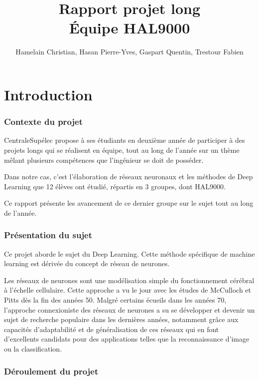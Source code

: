 \documentclass[a4paper,oneside]{report}
\title{Rapport projet long\\Équipe HAL9000}
\author{Hamelain Christian, Hasan Pierre-Yves, Gaspart Quentin, Trestour Fabien}
\begin{document}
    \setcounter{tocdepth}{1}


    \maketitle


    \tableofcontents


    \part{Introduction}

        \section[Contexte]{Contexte du projet}

            CentraleSupélec propose à  ses étudiants en deuxième année de participer
            à  des projets longs qui se réalisent en équipe, tout au long de l'année sur un thème mêlant plusieurs compétences que l'ingénieur se doit de posséder.

            Dans notre cas, c'est l'élaboration de réseaux neuronaux et les méthodes de Deep Learning que 12 élèves ont étudié, répartis en 3 groupes, dont HAL9000.

            Ce rapport présente les avancement de ce dernier groupe sur le sujet tout au long de l'année.


        \section{Présentation du sujet}

            Ce projet aborde le sujet du Deep Learning. Cette méthode spécifique de machine learning est dérivée du concept de réseau de neurones.

            Les réseaux de neurones sont une modélisation simple du fonctionnement cérébral
            à  l'échelle cellulaire. Cette approche a vu le jour avec les études de McCulloch et Pitts dès la fin des années 50. Malgré certains écueils dans les années 70, l'approche connexioniste des réseaux de neurones a su se développer et devenir un sujet de recherche populaire dans les dernières années, notamment grâce aux capacités d'adaptabilité et de généralisation de ces réseaux qui en font d'excellents candidats pour des applications telles que la reconnaissance d'image ou la classification.


        \section[Déroulement]{Déroulement du projet}
\end{document}
